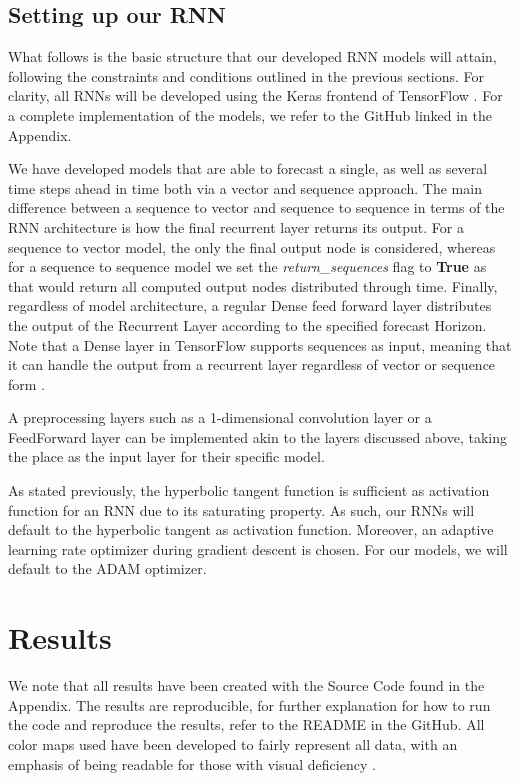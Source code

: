 \documentclass
[twocolumn,
secnumarabic,
nobibnotes,
aps,
prl,
reprint,
groupedaddress,
amsmath,
amssymb,
]{revtex4-2}
\begin{document}
\subsection{Setting up our RNN}
What follows is the basic structure that our developed RNN models will attain, following the constraints and conditions outlined in the previous sections. For clarity, all RNNs will be developed using the Keras frontend of TensorFlow \cite{tensorflow2015-whitepaper}. For a complete implementation of the models, we refer to the GitHub linked in the Appendix. 

We have developed models that are able to forecast a single, as well as several time steps ahead in time both via a vector and sequence approach. The main difference between a sequence to vector and sequence to sequence in terms of the RNN architecture is how the final recurrent layer returns its output. For a sequence to vector model, the only the final output node is considered, whereas for a sequence to sequence model we set the \textit{return\_sequences} flag to \textbf{True} as that would return all computed output nodes distributed through time. Finally, regardless of model architecture, a regular Dense feed forward layer distributes the output of the Recurrent Layer according to the specified forecast Horizon. Note that a Dense layer in TensorFlow supports sequences as input, meaning that it can handle the output from a recurrent layer regardless of vector or sequence form \cite{Geron2019}. 

A preprocessing layers such as a 1-dimensional convolution layer or a FeedForward layer can be implemented akin to the layers discussed above, taking the place as the input layer for their specific model.

As stated previously, the hyperbolic tangent function is sufficient as activation function for an RNN due to its saturating property. As such, our RNNs will default to the hyperbolic tangent as activation function. Moreover, an adaptive learning rate optimizer during gradient descent is chosen. For our models, we will default to the ADAM optimizer.

\section{Results}
We note that all results have been created with the Source Code found in the Appendix. The results are reproducible, for further explanation for how to run the code and reproduce the results, refer to the README in the GitHub. All color maps used have been developed to fairly represent all data, with an emphasis of being readable for those with visual deficiency \cite{Crameri2021}. 
\end{document}
